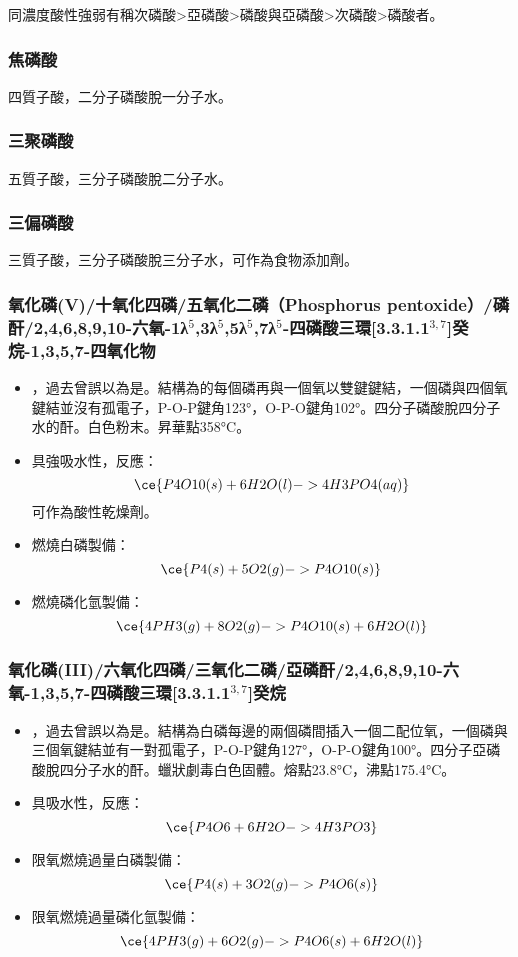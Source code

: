 \documentclass[a4paper,12pt]{report}
\begin{document}
同濃度酸性強弱有稱次磷酸>亞磷酸>磷酸與亞磷酸>次磷酸>磷酸者。
\subsubsection{焦磷酸}
四質子酸，二分子磷酸脫一分子水。
\subsubsection{三聚磷酸}
五質子酸，三分子磷酸脫二分子水。
\subsubsection{三偏磷酸}
三質子酸，三分子磷酸脫三分子水，可作為食物添加劑。
\subsubsection{氧化磷(V)/十氧化四磷/五氧化二磷（Phosphorus pentoxide）/磷酐/2,4,6,8,9,10-六氧-1λ$^5$,3λ$^5$,5λ$^5$,7λ$^5$-四磷酸三環[3.3.1.1$^{3,7}$]癸烷-1,3,5,7-四氧化物}
\begin{itemize}
\item {}，過去曾誤以為是。結構為的每個磷再與一個氧以雙鍵鍵結，一個磷與四個氧鍵結並沒有孤電子，P-O-P鍵角123°，O-P-O鍵角102°。四分子磷酸脫四分子水的酐。白色粉末。昇華點358°C。
\item 具強吸水性，反應：
\[\ce{P4O10(s) + 6H2O(l) -> 4H3PO4(aq)}\]
可作為酸性乾燥劑。
\item 燃燒白磷製備：
\[\ce{P4(s) + 5O2(g) -> P4O10(s)}\]
\item 燃燒磷化氫製備：
\[\ce{4PH3(g) + 8O2(g) -> P4O10(s) + 6H2O(l)}\]
\end{itemize}
\subsubsection{氧化磷(III)/六氧化四磷/三氧化二磷/亞磷酐/2,4,6,8,9,10-六氧-1,3,5,7-四磷酸三環[3.3.1.1$^{3,7}$]癸烷}
\begin{itemize}
\item {}，過去曾誤以為是。結構為白磷每邊的兩個磷間插入一個二配位氧，一個磷與三個氧鍵結並有一對孤電子，P-O-P鍵角127°，O-P-O鍵角100°。四分子亞磷酸脫四分子水的酐。蠟狀劇毒白色固體。熔點23.8°C，沸點175.4°C。
\item 具吸水性，反應：
\[\ce{P4O6 + 6H2O -> 4H3PO3}\]
\item 限氧燃燒過量白磷製備：
\[\ce{P4(s) + 3O2(g) -> P4O6(s)}\]
\item 限氧燃燒過量磷化氫製備：
\[\ce{4PH3(g) + 6O2(g) -> P4O6(s) + 6H2O(l)}\]
\end{itemize}
\end{document}
